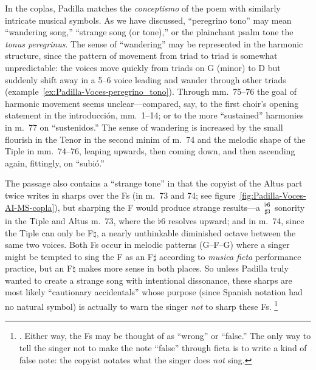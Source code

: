 \documentclass[11pt]{article}
\newcommand{\fl}{$\flat$}
\newcommand{\sh}{$\sharp$}
\newcommand{\na}{$\natural$}
\newcommand{\stack}[2]{$#1 \atop #2$}
\begin{document}
In the coplas, Padilla matches the \emph{conceptismo} of the poem with similarly intricate musical symbols.
As we have discussed, ``peregrino tono'' may mean ``wandering song,'' ``strange song (or tone),'' or the plainchant psalm tone the \emph{tonus peregrinus}.
The sense of ``wandering'' may be represented in the harmonic structure, since the pattern of movement from triad to triad is somewhat unpredictable: the voices move quickly from triads on G (minor) to D but suddenly shift away in a 5--6 voice leading and wander through other triads (example~\ref{ex:Padilla-Voces-peregrino_tono}).
Through mm.~75--76 the goal of harmonic movement seems unclear---compared, say, to the first choir's opening statement in the introducción, mm.~1--14; or to the more ``sustained'' harmonies in m.~77 on ``sustenidos.''
The sense of wandering is increased by the small flourish in the Tenor in the second minim of m.~74 and the melodic shape of the Tiple in mm.~74--76, leaping upwards, then coming down, and then ascending again, fittingly, on ``subió.''

The passage also contains a ``strange tone'' in that the copyist of the Altus part twice writes in sharps over the Fs (in m.~73 and 74; see figure~\ref{fig:Padilla-Voces-AI-MS-copla}), but sharping the F would produce strange results---a \stack{\flat6}{\sharp3} sonority in the Tiple and Altus m.~73, where the \fl{}6 resolves upward; and in m.~74, since the Tiple can only be F\na{}, a nearly unthinkable diminished octave between the same two voices. 
Both Fs occur in melodic patterns (G--F--G) where a singer might be tempted to sing the F as an F\sh{} according to \emph{musica ficta} performance practice, but an F\na{} makes more sense in both places.
So unless Padilla truly wanted to create a strange song with intentional dissonance, these sharps are most likely ``cautionary accidentals'' whose purpose (since Spanish notation had no natural symbol) is actually to warn the singer \emph{not} to sharp these Fs.%
	\footnote{%
	\Autocites{Harran:Cautionary1}{Harran:Cautionary2}{Berger:Ficta}. 
Either way, the Fs may be thought of as ``wrong'' or ``false.''
The only way to tell the singer not to make the note ``false'' through ficta is to write a kind of false note: the copyist notates what the singer does \emph{not} sing. 
	}
\end{document}
